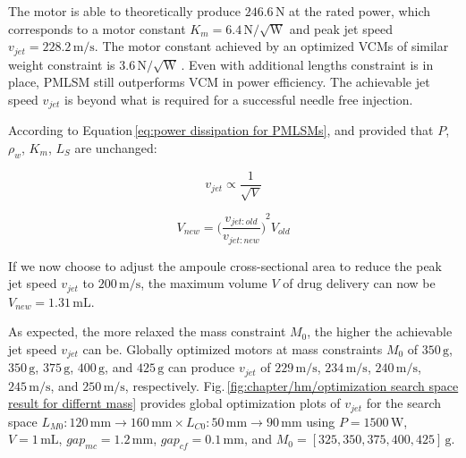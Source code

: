         
        The motor is able to theoretically produce $246.6\,\mathrm{N}$ at the rated power, which corresponds to a motor constant $K_m=6.4\,\mathrm{N/\sqrt{W}}$ and peak jet speed $v_{jet}=228.2\,\mathrm{m/s}$. The motor constant achieved by an optimized \acsp{VCM} of similar weight constraint is $3.6\,\mathrm{N/\sqrt{W}}$\,\cite{ruddy2014}. Even with additional lengths constraint is in place, \acs{PMLSM} still outperforms \acs{VCM} in power efficiency. The achievable jet speed $v_{jet}$ is beyond what is required for a successful needle free injection.
        
            
        According to Equation\,\ref{eq:power dissipation for PMLSMs}, and provided that $P$, $\rho_w$, $K_m$, $L_S$ are unchanged:
            
            
        \begin{equation}
            v_{jet}\propto\frac{1}{\sqrt{V}}
            \label{eq:v_jet and V}
        \end{equation}
            
            
        \begin{equation}
            V_{new}={\bigg(\frac{v_{jet:old}}{v_{jet:new}} \bigg)}^2 V_{old}
            \label{eq:v_jet and V ratio}
        \end{equation}
        
        

            
            
        If we now choose to adjust the ampoule cross-sectional area to reduce the peak jet speed $v_{jet}$ to $200\,\mathrm{m/s}$, the maximum volume $V$ of drug delivery can now be $V_{new}=1.31\,\mathrm{mL}$. 
            
            
        As expected, the more relaxed the mass constraint $M_0$, the higher the achievable jet speed $v_{jet}$ can be. Globally optimized motors at mass constraints $M_0$ of $350\,\mathrm{g}$, $350\,\mathrm{g}$, $375\,\mathrm{g}$, $400\,\mathrm{g}$, and $425\,\mathrm{g}$ can produce $v_{jet}$ of $229\,\mathrm{m/s}$, $234\,\mathrm{m/s}$, $240\,\mathrm{m/s}$, $245\,\mathrm{m/s}$, and $250\,\mathrm{m/s}$, respectively. Fig.\,\ref{fig:chapter/hm/optimization search space result for differnt mass} provides global optimization plots of $v_{jet}$ for the search space $L_{M0}:120\,\mathrm{mm}\rightarrow 160\,\mathrm{mm} \times L_{C0}:50\,\mathrm{mm}\rightarrow 90\,\mathrm{mm}$ using $P=1500\,\mathrm{W}$, $V=1\,\mathrm{mL}$, $gap_{mc}=1.2\,\mathrm{mm}$, $gap_{cf}=0.1\,\mathrm{mm}$,  and $M_0=[325,350,375,400,425]\,\mathrm{g}$. 
        
